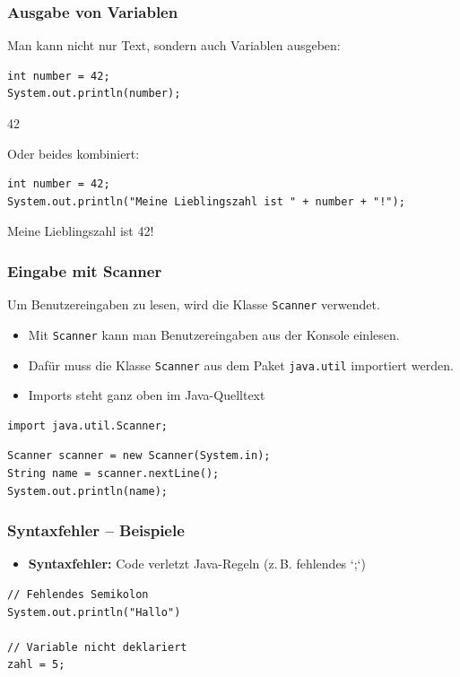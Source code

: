 \documentclass{../../presentation}
\begin{document}
\begin{frame}[fragile]
  \frametitle{Ausgabe von Variablen}
  \pause
  Man kann nicht nur Text, sondern auch Variablen ausgeben:
  \pause
  \begin{verbatim}
int number = 42;
System.out.println(number);
  \end{verbatim}
  \begin{ausgabe}
    42
  \end{ausgabe}
  \pause
  Oder beides kombiniert:
  \begin{verbatim}
int number = 42;
System.out.println("Meine Lieblingszahl ist " + number + "!");
  \end{verbatim}
  \pause
  \begin{ausgabe}
    Meine Lieblingszahl ist 42!
  \end{ausgabe}
\end{frame}

\begin{frame}[fragile]
  \frametitle{Eingabe mit Scanner}
  \pause
  Um Benutzereingaben zu lesen, wird die Klasse \texttt{Scanner} verwendet.
  \begin{itemize}
    \item Mit \texttt{Scanner} kann man Benutzereingaben aus der Konsole einlesen.
    \item Dafür muss die Klasse \texttt{Scanner} aus dem Paket \texttt{java.util} importiert werden.
    \item Imports steht ganz oben im Java-Quelltext
  \end{itemize}
  \pause
  \begin{verbatim}
import java.util.Scanner;
\end{verbatim}
  \pause
  \begin{verbatim}
Scanner scanner = new Scanner(System.in);
String name = scanner.nextLine();
System.out.println(name);
  \end{verbatim}
\end{frame}

\begin{frame}[fragile]
  \frametitle{Syntaxfehler – Beispiele}
  \begin{itemize}
    \item \textbf{Syntaxfehler:} Code verletzt Java-Regeln (z.\,B. fehlendes `;`)
  \end{itemize}
  \begin{verbatim}
// Fehlendes Semikolon
System.out.println("Hallo")

// Variable nicht deklariert
zahl = 5;
  \end{verbatim}
\end{frame}
\end{document}
